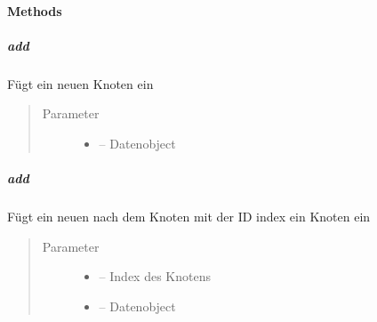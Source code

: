 \documentclass[letterpaper,10pt,ngerman]{sphinxmanual}
\begin{document}
\paragraph{Methods}
\label{\detokenize{com/linuxluigi/edu/list/BinaryLinkedList:methods}}

\subparagraph{add}
\label{\detokenize{com/linuxluigi/edu/list/BinaryLinkedList:add}}

\begin{fulllineitems}
\label{\detokenize{com/linuxluigi/edu/list/BinaryLinkedList:com.linuxluigi.edu.list.BinaryLinkedList.add(T)}}
Fügt ein neuen Knoten ein
\begin{quote}\begin{description}
\item[{Parameter}] \leavevmode\begin{itemize}
\item {} 
 -- Datenobject

\end{itemize}

\end{description}\end{quote}

\end{fulllineitems}



\subparagraph{add}
\label{\detokenize{com/linuxluigi/edu/list/BinaryLinkedList:id1}}

\begin{fulllineitems}
\label{\detokenize{com/linuxluigi/edu/list/BinaryLinkedList:com.linuxluigi.edu.list.BinaryLinkedList.add(int, T)}}
Fügt ein neuen nach dem Knoten mit der ID index ein Knoten ein
\begin{quote}\begin{description}
\item[{Parameter}] \leavevmode\begin{itemize}
\item {} 
 -- Index des Knotens

\item {} 
 -- Datenobject

\end{itemize}

\end{description}\end{quote}

\end{fulllineitems}
\end{document}

